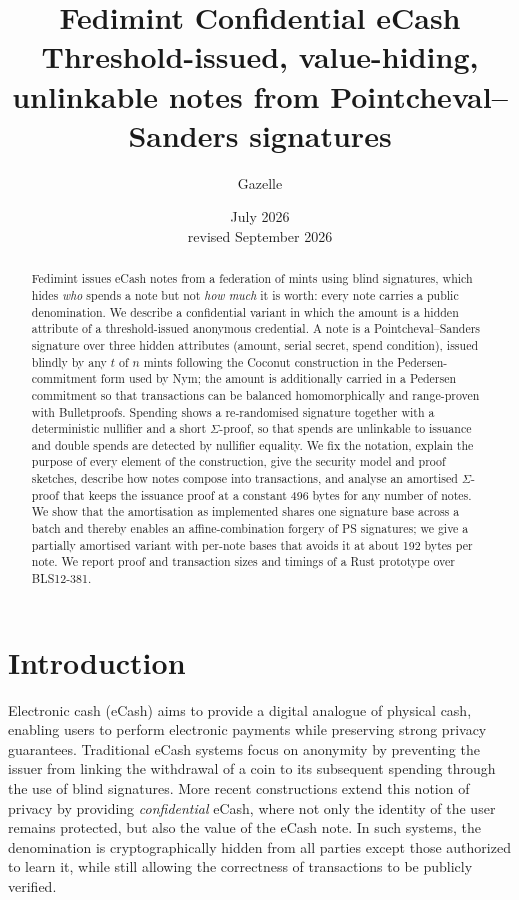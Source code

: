 \documentclass[10pt,a5paper]{article}
\title{Fedimint Confidential eCash\\[4pt]\large Threshold-issued, value-hiding, unlinkable notes from Pointcheval--Sanders signatures}
\author{Gazelle}
\date{July 2026 \\ \small revised September 2026}
\begin{document}
\maketitle

\begin{abstract}
Fedimint issues eCash notes from a federation of mints using blind signatures,
which hides \emph{who} spends a note but not \emph{how much} it is worth: every
note carries a public denomination. We describe a confidential variant in which
the amount is a hidden attribute of a threshold-issued anonymous credential. A
note is a Pointcheval--Sanders signature over three hidden attributes (amount,
serial secret, spend condition), issued blindly by any $t$ of $n$ mints following
the Coconut construction in the Pedersen-commitment form used by Nym; the amount
is additionally carried in a Pedersen commitment so that transactions can be
balanced homomorphically and range-proven with Bulletproofs. Spending shows a
re-randomised signature together with a deterministic nullifier and a short
$\Sigma$-proof, so that spends are unlinkable to issuance and double spends are
detected by nullifier equality. We fix the notation, explain the purpose of
every element of the construction, give the security model and proof sketches,
describe how notes compose into transactions, and analyse an amortised
$\Sigma$-proof that keeps the issuance proof at a constant 496 bytes for any
number of notes. We show that the amortisation as implemented shares one
signature base across a batch and thereby enables an affine-combination forgery
of PS signatures; we give a partially amortised variant with per-note bases
that avoids it at about 192 bytes per note. We report proof and transaction
sizes and timings of a Rust prototype over BLS12-381.
\end{abstract}

\section{Introduction}

Electronic cash (eCash) aims to provide a digital analogue of physical cash,
enabling users to perform electronic payments while preserving strong privacy
guarantees. Traditional eCash systems focus on anonymity by preventing the
issuer from linking the withdrawal of a coin to its subsequent spending through
the use of blind signatures. More recent constructions extend this notion of
privacy by providing \emph{confidential} eCash, where not only the identity of
the user remains protected, but also the value of the eCash note. In such
systems, the denomination is cryptographically hidden from all parties except
those authorized to learn it, while still allowing the correctness of
transactions to be publicly verified.
\end{document}
